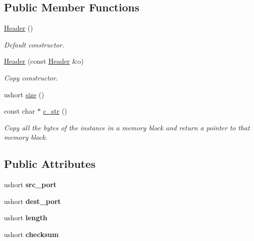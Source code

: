 \subsection*{Public Member Functions}
\begin{DoxyCompactItemize}
\item 
\hyperlink{structudp_1_1Header_a47e86aabf149c64ede0cc55ed8888bff}{Header} ()
\begin{DoxyCompactList}\small\item\em Default constructor. \end{DoxyCompactList}\item 
\hyperlink{structudp_1_1Header_a4834b505432f80ca2eb9db6d51ab2c00}{Header} (const \hyperlink{structudp_1_1Header}{Header} \&o)
\begin{DoxyCompactList}\small\item\em Copy constructor. \end{DoxyCompactList}\item 
ushort \hyperlink{structudp_1_1Header_aeb0e9c82b2e6471758d8731ed590a502}{size} ()
\item 
const char $\ast$ \hyperlink{structudp_1_1Header_a9e39bb61a6c644edb6861f8fcb7b927d}{c\+\_\+str} ()
\begin{DoxyCompactList}\small\item\em Copy all the bytes of the instance in a memory block and return a pointer to that memory block. \end{DoxyCompactList}\end{DoxyCompactItemize}
\subsection*{Public Attributes}
\begin{DoxyCompactItemize}
\item 
ushort {\bfseries src\+\_\+port}\hypertarget{structudp_1_1Header_ae751d4065b7ffd06ca2aee668efaea93}{}\label{structudp_1_1Header_ae751d4065b7ffd06ca2aee668efaea93}

\item 
ushort {\bfseries dest\+\_\+port}\hypertarget{structudp_1_1Header_ac27f21b3a306cd9fbb82aa59183da569}{}\label{structudp_1_1Header_ac27f21b3a306cd9fbb82aa59183da569}

\item 
ushort {\bfseries length}\hypertarget{structudp_1_1Header_abb666da1f6ca9da00addcf288b79dabe}{}\label{structudp_1_1Header_abb666da1f6ca9da00addcf288b79dabe}

\item 
ushort {\bfseries checksum}\hypertarget{structudp_1_1Header_aeb4dde21af1f921c94c8fb1106dfbf05}{}\label{structudp_1_1Header_aeb4dde21af1f921c94c8fb1106dfbf05}

\end{DoxyCompactItemize}


